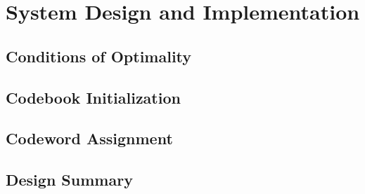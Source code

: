 \documentclass[10pt]{article}
\begin{document}
\section{System Design and Implementation}

\subsection{Conditions of Optimality}



\subsection{Codebook Initialization}


\subsection{Codeword Assignment}

\subsection{Design Summary}
\end{document}
